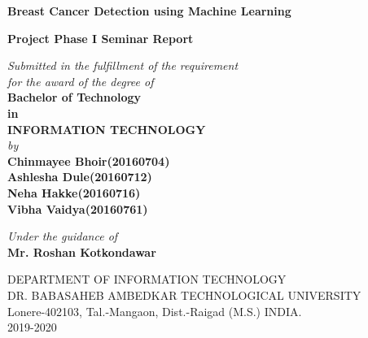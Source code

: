 \documentclass{report}
\begin{document}
\begin{titlepage}
	\begin{center}
\large	{\bf Breast Cancer Detection using Machine Learning}\\
\vspace{0.1in}


		{ \bf Project Phase I Seminar Report\\
		{}	\vspace{0.1in} }
		\vspace{0.1in}
		
	
		{\it Submitted in the fulfillment of the requirement}\\
		{\it for the award of the degree of}\\
		\vspace{0.2in}
		{\bf Bachelor of Technology}\\
		\vspace{0.2in}
		{\bf in}\\
		\vspace{0.2in}
		{\bf INFORMATION TECHNOLOGY}\\
		\vspace{0.2in}
		{\it by}\\
		\vspace{0.1in}
		{\bf Chinmayee Bhoir(20160704)}\\
		{\bf Ashlesha Dule(20160712)}\\
		{\bf Neha Hakke(20160716)}\\
		{\bf Vibha Vaidya(20160761)}\\
		\vspace{0.3in}
			\vspace{0.1in}
				
		{\it Under the guidance of}\\
		\vspace{0.1in}
		{\large \textbf{Mr. Roshan Kotkondawar}}\\
		\vspace{0.1in}
		
		\begin{figure}[h]
			\centerline{}
			\label{atcres}
		\end{figure}
		
		{\small DEPARTMENT OF INFORMATION TECHNOLOGY \\
			{\large DR. BABASAHEB AMBEDKAR TECHNOLOGICAL UNIVERSITY}\\
			{\small Lonere-402103, Tal.-Mangaon, Dist.-Raigad (M.S.) INDIA.}\\
			2019-2020}
	\end{center}
\end{titlepage}
\end{document}
